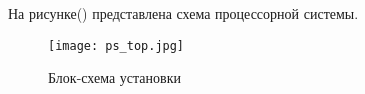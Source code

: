 На рисунке() представлена схема процессорной системы.
\begin{figure}[ht]
    \centering
    \texttt{[image: ps\_top.jpg]}
    \caption{Блок-схема установки}
    \label{fig:mpr}
\end{figure}

